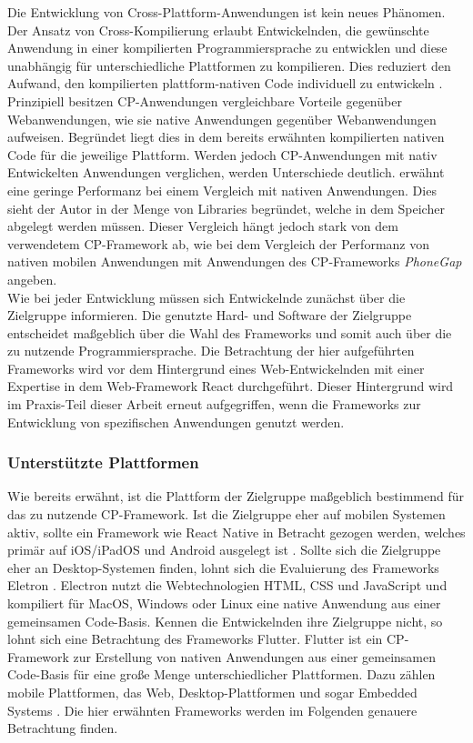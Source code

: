 \documentclass[a4paper]{scrartcl}
\begin{document}
Die Entwicklung von Cross-Plattform-Anwendungen ist kein neues Phänomen. Der Ansatz von Cross-Kompilierung erlaubt Entwickelnden, die gewünschte Anwendung in einer kompilierten Programmiersprache zu entwicklen und diese unabhängig für unterschiedliche Plattformen zu kompilieren. Dies reduziert den Aufwand, den kompilierten plattform-nativen Code individuell zu entwickeln \autocite[7]{Xamarin}. \\
Prinzipiell besitzen CP-Anwendungen vergleichbare Vorteile gegenüber Webanwendungen, wie sie native Anwendungen gegenüber Webanwendungen aufweisen. Begründet liegt dies in dem bereits erwähnten kompilierten nativen Code für die jeweilige Plattform. Werden jedoch CP-Anwendungen mit nativ Entwickelten Anwendungen verglichen, werden Unterschiede deutlich. \textcite[7]{Xamarin} erwähnt eine geringe Performanz bei einem Vergleich mit nativen Anwendungen. Dies sieht der Autor in der Menge von Libraries begründet, welche in dem Speicher abgelegt werden müssen. Dieser Vergleich hängt jedoch stark von dem verwendetem CP-Framework ab, wie \textcite[134]{CP-mobile} bei dem Vergleich der Performanz von nativen mobilen Anwendungen mit Anwendungen des CP-Frameworks \textit{PhoneGap} angeben. \\
Wie bei jeder Entwicklung müssen sich Entwickelnde zunächst über die Zielgruppe informieren. Die genutzte Hard- und Software der Zielgruppe entscheidet maßgeblich über die Wahl des Frameworks und somit auch über die zu nutzende Programmiersprache. Die Betrachtung der hier aufgeführten Frameworks wird vor dem Hintergrund eines Web-Entwickelnden mit einer Expertise in dem Web-Framework React durchgeführt. Dieser Hintergrund wird im Praxis-Teil dieser Arbeit erneut aufgegriffen, wenn die Frameworks zur Entwicklung von spezifischen Anwendungen genutzt werden.

\subsubsection{Unterstützte Plattformen}

Wie bereits erwähnt, ist die Plattform der Zielgruppe maßgeblich bestimmend für das zu nutzende CP-Framework. Ist die Zielgruppe eher auf mobilen Systemen aktiv, sollte ein Framework wie React Native in Betracht gezogen werden, welches primär auf iOS/iPadOS und Android ausgelegt ist \autocite{React_Native}. Sollte sich die Zielgruppe eher an Desktop-Systemen finden, lohnt sich die Evaluierung des Frameworks Eletron \autocite{Electron.js}. Electron nutzt die Webtechnologien HTML, CSS und JavaScript und kompiliert für MacOS, Windows oder Linux eine native Anwendung aus einer gemeinsamen Code-Basis. Kennen die Entwickelnden ihre Zielgruppe nicht, so lohnt sich eine Betrachtung des Frameworks Flutter. Flutter ist ein CP-Framework zur Erstellung von nativen Anwendungen aus einer gemeinsamen Code-Basis für eine große Menge unterschiedlicher Plattformen. Dazu zählen mobile Plattformen, das Web, Desktop-Plattformen und sogar Embedded Systems \autocite{Flutter}. Die hier erwähnten Frameworks werden im Folgenden genauere Betrachtung finden.
\end{document}
